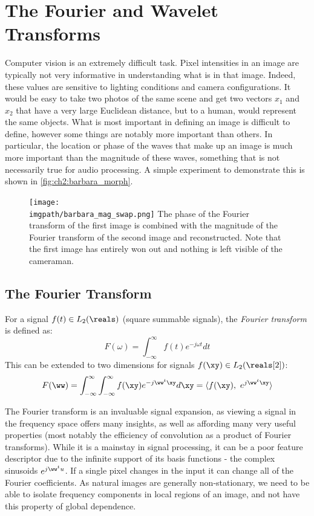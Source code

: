\section{The Fourier and Wavelet Transforms}

  Computer vision is an extremely difficult task. Pixel intensities in an image are
  typically not very informative in understanding what is in that image. Indeed,
  these values are sensitive to lighting conditions and camera configurations.
  It would be easy to take two photos of the same scene and get two vectors
  $x_1$ and $x_2$ that have a very large Euclidean distance, but to a human,
  would represent the same objects. What is most important in defining an image is
  difficult to define, however some things are notably more important than
  others. In particular, the location or phase of the waves that make up an
  image is much more important than the magnitude of these waves, something
  that is not necessarily true for audio processing. A simple experiment to
  demonstrate this is shown in \autoref{fig:ch2:barbara_morph}. 
  \begin{figure}
    \centering
      \texttt{[image: \\imgpath/barbara\_mag\_swap.png]}
        {The phase of the Fourier transform of the first image is combined with
        the magnitude of the Fourier transform of the second image and
        reconstructed. Note that the first image has entirely won out and
        nothing is left visible of the cameraman.}
      \label{fig:ch2:barbara_morph}
  \end{figure}

\subsection{The Fourier Transform}
For a signal $f(t) \in L_2(\reals)$ (square summable signals), the \emph{Fourier
transform} is defined as:
\begin{equation}
  F(\omega) = \int_{-\infty}^{\infty} f(t) e^{-j\omega t} dt
\end{equation}
This can be extended to two dimensions for signals $f(\xy) \in L_2(\reals[2])$:
\begin{equation}
  F(\ww) = \int_{-\infty}^{\infty}\int_{-\infty}^{\infty} f(\xy) e^{-j\ww^t \xy} d\xy = \langle f(\xy),\ e^{j\ww^t \xy} \rangle
\end{equation}

The Fourier transform is an invaluable signal expansion, as viewing a signal in
the frequency space offers many insights, as well as affording many very useful
properties (most notably the efficiency of convolution as a product of Fourier
transforms). While it is a mainstay in signal processing, 
it can be a poor
feature descriptor due to the infinite support of its basis functions - the
complex sinusoids $e^{j\ww^t u}$. If
a single pixel changes in the input it can change all of the
Fourier coefficients. As natural images are generally non-stationary, we need
to be able to isolate frequency components in local regions of an image, and
not have this property of global dependence.

